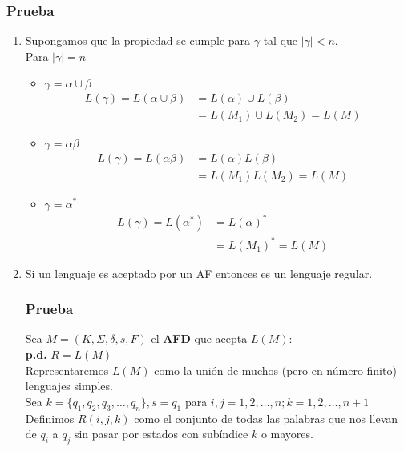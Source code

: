 \subsubsection*{Prueba}
\begin{enumerate}
\item Supongamos que la propiedad se cumple para $\gamma$ tal que $|\gamma| < n$.\\${ }$\\ Para $|\gamma|=n$
\begin{itemize}
\item $\gamma=\alpha\cup\beta$
\begin{align*}
L(\gamma) = L(\alpha\cup\beta)&= L(\alpha)\cup L(\beta) & \\
	                       &= L(M_1)\cup L(M_2)      =L(M)
\end{align*}
\item $\gamma=\alpha\beta$
\begin{align*}
L(\gamma) = L(\alpha\beta)&= L(\alpha) L(\beta) & \\
	                       &= L(M_1) L(M_2)      =L(M)
\end{align*}
\item $\gamma=\alpha^*$
\begin{align*}
L(\gamma) = L(\alpha^*)&= L(\alpha)^* & \\
	                       &= L(M_1)^*      =L(M)
\end{align*}
\end{itemize}
\item Si un lenguaje es aceptado por un AF entonces es un lenguaje regular.
\subsubsection*{Prueba}
Sea $M = (K,\Sigma,\delta,s,F)$ el \textbf{AFD} que acepta $L(M)$: \\${ }$\\
\textbf{p.d.} $R=L(M)$ \\${ }$\\
Representaremos $L(M)$ como la unión de muchos (pero en número finito) lenguajes simples.
\\${ }$\\
Sea $k=\{q_1,q_2,q_3,\ldots,q_n \} , s =q_1$ para $i,j = 1,2,\ldots,n ; k = 1,2,\ldots,n+1$ \\ ${ }$\\
Definimos $R(i,j,k)$ como el conjunto de todas las palabras que nos llevan de $q_i$ a $q_j$ sin pasar por estados con subíndice $k$ o mayores.

\end{enumerate}
